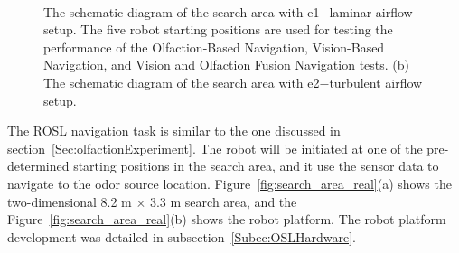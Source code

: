 \begin{figure}[h!] %
\ \\
\vspace*{-.18in}
\begin{center}
\hspace*{0.04in}
\hspace*{0.04in}
\end{center}
\vspace{-.1in}

\caption
{The schematic diagram of the search area with e1$-$laminar airflow setup. The five robot starting positions are used for testing the performance of the Olfaction-Based Navigation, Vision-Based Navigation, and Vision and Olfaction Fusion Navigation tests. {(b)} The schematic diagram of the search area with e2$-$turbulent airflow setup.}
\label{fig:demonstration}
\end{figure}

The ROSL navigation task is similar to the one discussed in section~\ref{Sec:olfactionExperiment}. The robot will be initiated at one of the pre-determined starting positions in the search area, and it use the sensor data to navigate to the odor source location. Figure~\ref{fig:search_area_real}(a) shows the two-dimensional 8.2 m $\times$ 3.3 m search area, and the Figure~\ref{fig:search_area_real}(b) shows the robot platform. The robot platform development was detailed in subsection~\ref{Subec:OSLHardware}.

